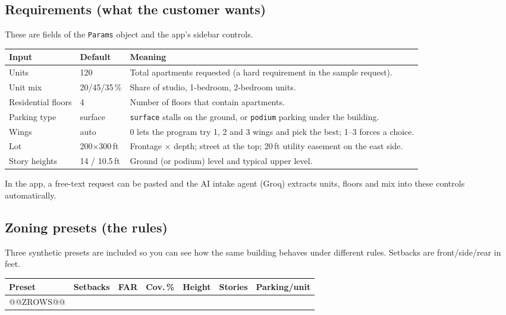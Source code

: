 \documentclass[11pt]{article}
\begin{document}
\subsection{Requirements (what the customer wants)}
These are fields of the \texttt{Params} object and the app's sidebar controls.
\begin{table}[H]\centering\small
\begin{tabular}{@{}llp{8cm}@{}}\toprule
Input & Default & Meaning \\ \midrule
Units & 120 & Total apartments requested (a hard requirement in the sample request). \\
Unit mix & 20/45/35\,\% & Share of studio, 1-bedroom, 2-bedroom units. \\
Residential floors & 4 & Number of floors that contain apartments. \\
Parking type & surface & \texttt{surface} stalls on the ground, or \texttt{podium} parking under the building. \\
Wings & auto & 0 lets the program try 1, 2 and 3 wings and pick the best; 1--3 forces a choice. \\
Lot & 200$\times$300\,ft & Frontage $\times$ depth; street at the top; 20\,ft utility easement on the east side. \\
Story heights & 14 / 10.5\,ft & Ground (or podium) level and typical upper level. \\ \bottomrule
\end{tabular}\end{table}
In the app, a free-text request can be pasted and the AI intake agent (Groq) extracts units, floors and mix into these controls automatically.

\subsection{Zoning presets (the rules)}
Three synthetic presets are included so you can see how the same building behaves under different rules. Setbacks are front/side/rear in feet.
\begin{table}[H]\centering\small
\begin{tabular}{lllllll}\toprule
Preset & Setbacks & FAR & Cov.\,\% & Height & Stories & Parking/unit \\ \midrule
@@ZROWS@@\bottomrule\end{tabular}\end{table}
\end{document}
